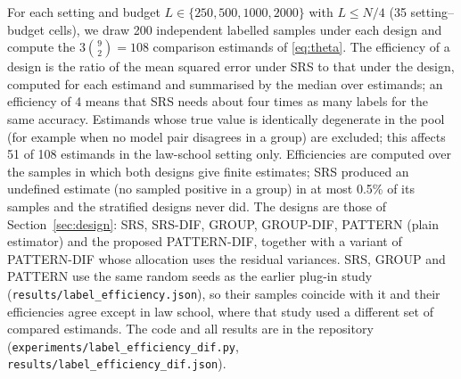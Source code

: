 For each setting and budget $L\in\{250,500,1000,2000\}$ with $L\le N/4$ (35 setting--budget cells), we draw 200 independent labelled samples under each design and compute the $3\binom{9}{2}=108$ comparison estimands of \eqref{eq:theta}. The efficiency of a design is the ratio of the mean squared error under SRS to that under the design, computed for each estimand and summarised by the median over estimands; an efficiency of 4 means that SRS needs about four times as many labels for the same accuracy. Estimands whose true value is identically degenerate in the pool (for example when no model pair disagrees in a group) are excluded; this affects 51 of 108 estimands in the law-school setting only. Efficiencies are computed over the samples in which both designs give finite estimates; SRS produced an undefined estimate (no sampled positive in a group) in at most 0.5\% of its samples and the stratified designs never did. The designs are those of Section~\ref{sec:design}: SRS, SRS-DIF, GROUP, GROUP-DIF, PATTERN (plain estimator) and the proposed PATTERN-DIF, together with a variant of PATTERN-DIF whose allocation uses the residual variances. SRS, GROUP and PATTERN use the same random seeds as the earlier plug-in study (\texttt{results/label\_efficiency.json}), so their samples coincide with it and their efficiencies agree except in law school, where that study used a different set of compared estimands. The code and all results are in the repository (\texttt{experiments/label\_efficiency\_dif.py}, \texttt{results/label\_efficiency\_dif.json}).

\begin{table}[t]\centering\small
\caption{Data settings. Pool: size of the held-out pool from which labels are drawn. $P_0,P_1$: positives in each group. Disagreement: share of pool instances on which two of the three most accurate models disagree, averaged over the three pairs. Groups marked ``arbitrary'' are median splits of a numeric feature.}\label{tab:data}

\end{table}

